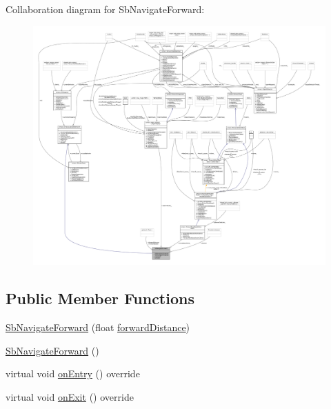 Collaboration diagram for Sb\+Navigate\+Forward\+:
\nopagebreak
\begin{figure}[H]
\begin{center}
\leavevmode
\includegraphics[width=350pt]{classSbNavigateForward__coll__graph}
\end{center}
\end{figure}
\subsection*{Public Member Functions}
\begin{DoxyCompactItemize}
\item 
\hyperlink{classSbNavigateForward_a151cdb95352703ff9065fd0d34ddcdda}{Sb\+Navigate\+Forward} (float \hyperlink{classSbNavigateForward_adc99629f937c3d43fa56a59ca16f9aee}{forward\+Distance})
\item 
\hyperlink{classSbNavigateForward_a4b6a96bcd0055a5186dbecdc48f8a03b}{Sb\+Navigate\+Forward} ()
\item 
virtual void \hyperlink{classSbNavigateForward_a0e01d850ed0e028f3b9b3704862c7ea5}{on\+Entry} () override
\item 
virtual void \hyperlink{classSbNavigateForward_a1c42c93d5b3cda87c918971eab5dff54}{on\+Exit} () override
\end{DoxyCompactItemize}
